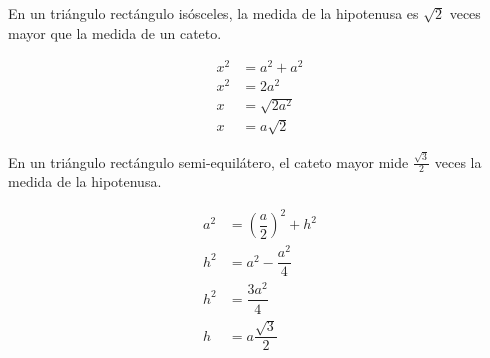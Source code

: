 \begin{theorem}

    En un triángulo rectángulo isósceles, la medida de la hipotenusa es $\sqrt{2}$ veces mayor que la medida de un cateto.

    \begin{center}
        \noindent 
        \begin{minipage}{0.2\textwidth}
            \vspace{0.5cm}
            \centering
            
            \label{fig:rectangulo-isosceles}
        \end{minipage}
        \hspace{0.01\textwidth}
        \begin{minipage}{0.4\textwidth}
            \begin{equation*}
                \begin{split}
                    x^2 &= a^2 + a^2 \\
                    x^2 &= 2a^2 \\
                    x &= \sqrt{2a^2} \\
                    x &= a\sqrt{2}
                \end{split}
            \end{equation*}
        \end{minipage}
    \end{center}
\end{theorem}

\begin{theorem}
    En un triángulo rectángulo semi-equilátero, el cateto mayor mide $\frac{\sqrt{3}}{2}$ veces la medida de la hipotenusa.

    \begin{center}
        \noindent
        \begin{minipage}{0.3\textwidth}
            \vspace{0.5cm}
            
            \label{fig:triángulo semi-equilatero}
        \end{minipage}
        \hspace{0.05\textwidth}
        \begin{minipage}{0.3\textwidth}
            \begin{equation*}
                \begin{split}
                    a^2 &=  \left(\dfrac{a}{2}\right)^2 + h^2 \\
                    h^2 &= a^2 - \dfrac{a^2}{4} \\
                    h^2 &= \dfrac{3a^2}{4}  \\
                    h &= a\dfrac{\sqrt{3}}{2}
                \end{split}
            \end{equation*}
        \end{minipage}
        \hspace{0.05\textwidth}
    \end{center}
    
\end{theorem}


\nocite{MGECED05}
\printbibliography[heading=subbibliography,title={Bibliografía}]